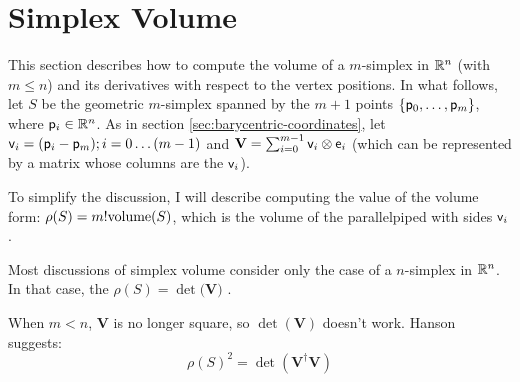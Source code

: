 
\section{Simplex Volume}
\label{sec:simplex_volume}

\nocite{graphics-gems-4-1994}
\nocite{goodman-orourke-hdcg-2004}

This section describes how to compute
the volume of a $m$-simplex in $\mathbb{R}^n$ (with $m \le n$)
and its derivatives with respect to the vertex positions.
In what follows, let $S$ be the geometric $m$-simplex
spanned by the $m+1$ points $\{\mathsf{p}_0 , \ldots , \mathsf{p}_m\}$,
where $\mathsf{p}_i \in \mathbb{R}^n$.
As in section \ref{sec:barycentric-coordinates},
let $\mathsf{v}_i = (\mathsf{p}_i - \mathsf{p}_m); i = 0 \ldots (m-1)$
and ${\mathbf V} = \sum_{i=0}^{m-1} \mathsf{v}_i \otimes \mathsf{e}_i$
(which can be represented by a matrix whose columns are the $\mathsf{v}_i$).

To simplify the discussion, I will describe computing the
value of the volume form: $\rho(S) = m! \mathrm{volume}(S)$,
which is the volume of the parallelpiped with sides $\mathsf{v}_i$.

Most discussions of simplex volume consider
only the case of a $n$-simplex in $\mathbb{R}^n$.
In that case, the $\rho(S) = \det({\mathbf V)}$
\cite{henk-richter-gebet-ziegler-hdcg-16-2004}.

When $m < n$, ${\mathbf V}$ is no longer square,
so $\det({\mathbf V})$ doesn't work.
Hanson \cite{hanson-1994} suggests:
\begin{equation}
\rho(S)^2 = \det({\mathbf V}^{\dagger} {\mathbf V})
\end{equation}

